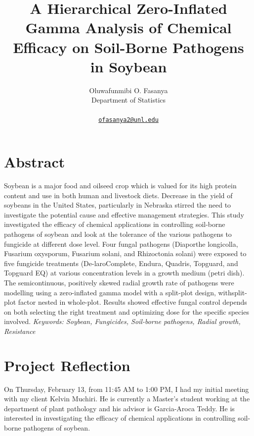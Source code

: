 \documentclass[
  10pt,
  letterpaper,
  twocolumn]{article}
\title{A Hierarchical Zero-Inflated Gamma Analysis of Chemical Efficacy
on Soil-Borne Pathogens in Soybean}
\author{
Oluwafunmibi O. Fasanya\\
Department of Statistics\\\\
{\tt \href{mailto:ofasanya2@unl.edu}{ofasanya2@unl.edu}}\\
}
\date{}
\begin{document}
\maketitle
\ifdefined\Shaded\renewenvironment{Shaded}{\begin{tcolorbox}[borderline west={3pt}{0pt}{shadecolor}, interior hidden, enhanced, frame hidden, boxrule=0pt, breakable, sharp corners]}{\end{tcolorbox}}\fi

\hypertarget{abstract}{%
\section{Abstract}\label{abstract}}

\vspace{-1em}

Soybean is a major food and oilseed crop which is valued for its high
protein content and use in both human and livestock diets. Decrease in
the yield of soybeans in the United States, particularly in Nebraska
stirred the need to investigate the potential cause and effective
management strategies. This study investigated the efficacy of chemical
applications in controlling soil-borne pathogens of soybean and look at
the tolerance of the various pathogens to fungicide at different dose
level. Four fungal pathogens (Diaporthe longicolla, Fusarium oxysporum,
Fusarium solani, and Rhizoctonia solani) were exposed to five fungicide
treatments (De-laroComplete, Endura, Quadris, Topguard, and Topguard EQ)
at various concentration levels in a growth medium (petri dish). The
semicontinuous, positively skewed radial growth rate of pathogens were
modelling using a zero-inflated gamma model with a split-plot design,
withsplit-plot factor nested in whole-plot. Results showed effective
fungal control depends on both selecting the right treatment and
optimizing dose for the specific species involved. \emph{Keywords:
Soybean, Fungicides, Soil-borne pathogens, Radial growth, Resistance}

\hypertarget{project-reflection}{%
\section{Project Reflection}\label{project-reflection}}

\vspace{-1em}

On Thursday, February 13, from 11:45 AM to 1:00 PM, I had my initial
meeting with my client Kelvin Muchiri. He is currently a Master's
student working at the department of plant pathology and his advisor is
Garcia-Aroca Teddy. He is interested in investigating the efficacy of
chemical applications in controlling soil-borne pathogens of soybean.
\end{document}
